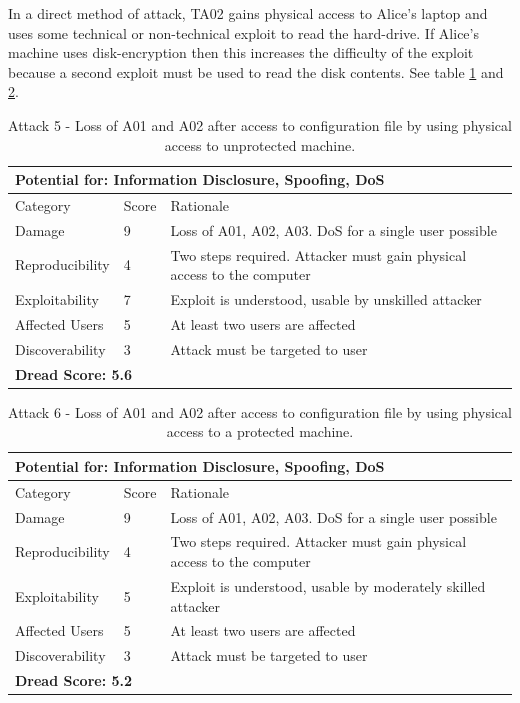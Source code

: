 \documentclass [11pt, proquest] {uwthesis}[2020/02/24]
\begin{document}
In a direct method of attack, TA02 gains physical access to Alice's laptop and uses some technical or non-technical exploit to read the hard-drive. If Alice's machine uses disk-encryption then this increases the difficulty of the exploit because a second exploit must be used to read the disk contents.
See table \ref{attack5-ref} and \ref{attack6-ref}.
\begin{table}[H]
\label{attack5-ref}
\begin{tabular}{|m{3cm}|m{.9cm}|p{27em} |}
\multicolumn{3}{l}{Potential for: Information Disclosure, Spoofing, DoS}                   \\
\hline
Category & Score & Rationale \\
\hline
Damage          & 9     & Loss of A01, A02, A03. DoS for a single user possible            \\
\hline
Reproducibility & 4     & Two steps required. Attacker must gain physical access to the computer     \\
\hline
Exploitability & 7      & Exploit is understood, usable by unskilled attacker \\
\hline
Affected Users  & 5     & At least two users are affected                      \\
\hline
Discoverability & 3     & Attack must be targeted to user \\
\hline
\multicolumn{3}{l}{\textbf{Dread Score: 5.6}} 
\end{tabular}
\caption{Attack 5 - Loss of A01 and A02 after access to configuration file by using physical access to unprotected machine.}
\end{table}
\begin{table}[H]
\label{attack6-ref}
\begin{tabular}{|m{3cm}|m{.9cm}|p{27em} |}
\multicolumn{3}{l}{Potential for: Information Disclosure, Spoofing, DoS}                   \\
\hline
Category & Score & Rationale \\
\hline
Damage          & 9     & Loss of A01, A02, A03. DoS for a single user possible            \\
\hline
Reproducibility & 4     & Two steps required. Attacker must gain physical access to the computer     \\
\hline
Exploitability & 5      & Exploit is understood, usable by moderately skilled attacker  \\
\hline
Affected Users  & 5     & At least two users are affected                      \\
\hline
Discoverability & 3     & Attack must be targeted to user \\
\hline
\multicolumn{3}{l}{\textbf{Dread Score: 5.2}} 
\end{tabular}
\caption{Attack 6 - Loss of A01 and A02 after access to configuration file by using physical access to a protected machine.}
\end{table}
\end{document}
